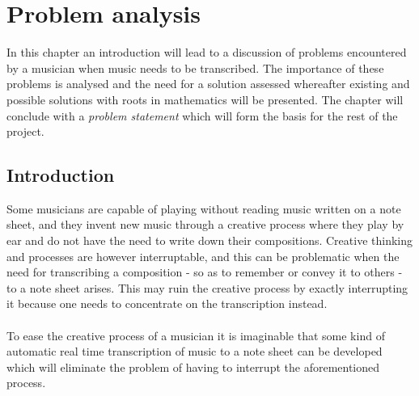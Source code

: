 \chapter{Problem analysis} \label{ch1}
In this chapter an introduction will lead to a discussion of problems encountered by a musician when music needs to be transcribed. The importance of these problems is analysed and the need for a solution assessed whereafter existing and possible solutions with roots in mathematics will be presented. The chapter will conclude with a \textit{problem statement} which will form the basis for the rest of the project.
\section{Introduction}
Some musicians are capable of playing without reading music written on a note sheet, and they invent new music through a creative process where they play by ear and do not have the need to write down their compositions. Creative thinking and processes are however interruptable, and this can be problematic when the need for transcribing a composition - so as to remember or convey it to others - to a note sheet arises. This may ruin the creative process by exactly interrupting it because one needs to concentrate on the transcription instead. \\\\
To ease the creative process of a musician it is imaginable that some kind of automatic real time transcription of music to a note sheet can be developed which will eliminate the problem of having to interrupt the aforementioned process.
